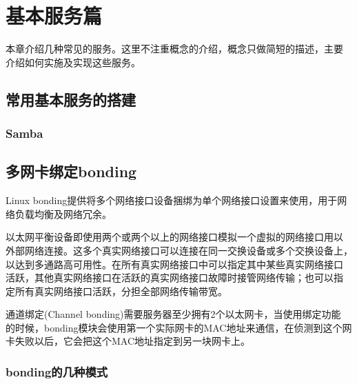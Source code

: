 \part{基本服务篇}

本章介绍几种常见的服务。这里不注重概念的介绍，概念只做简短的描述，主要
介绍如何实施及实现这些服务。

\chapter{常用基本服务的搭建}











\section{Samba}







\chapter{多网卡绑定bonding}

Linux bonding提供将多个网络接口设备捆绑为单个网络接口设置来使用，用于网
络负载均衡及网络冗余。

以太网平衡设备即使用两个或两个以上的网络接口模拟一个虚拟的网络接口用以
外部网络连接。这多个真实网络接口可以连接在同一交换设备或多个交换设备上，
以达到多通路高可用性。在所有真实网络接口中可以指定其中某些真实网络接口
活跃，其他真实网络接口在活跃的真实网络接口故障时接管网络传输；也可以指
定所有真实网络接口活跃，分担全部网络传输带宽。
 
通道绑定(Channel bonding)需要服务器至少拥有2个以太网卡，当使用绑定功能
的时候，bonding模块会使用第一个实际网卡的MAC地址来通信，在侦测到这个网
卡失败以后，它会把这个MAC地址指定到另一块网卡上。

\section{bonding的几种模式}

